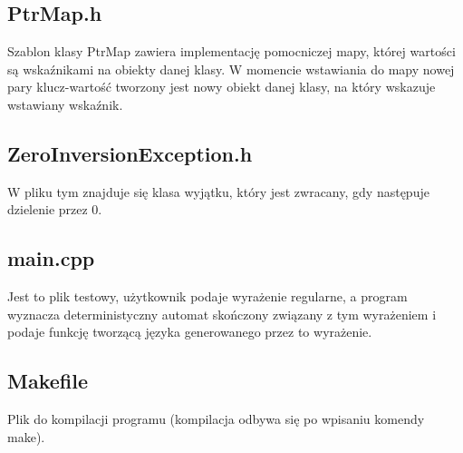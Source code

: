 \subsection{PtrMap.h}

Szablon klasy PtrMap zawiera implementację pomocniczej mapy, której wartości są wskaźnikami na obiekty danej klasy. W momencie wstawiania do mapy nowej pary klucz-wartość tworzony jest nowy obiekt danej klasy, na który wskazuje wstawiany wskaźnik.

\subsection{ZeroInversionException.h}

W pliku tym znajduje się klasa wyjątku, który jest zwracany, gdy następuje dzielenie przez 0.

\subsection{main.cpp}

Jest to plik testowy, użytkownik podaje wyrażenie regularne, a program wyznacza deterministyczny automat skończony związany z tym wyrażeniem i podaje funkcję tworzącą języka generowanego przez to wyrażenie.

\subsection{Makefile}

Plik do kompilacji programu (kompilacja odbywa się po wpisaniu komendy make).